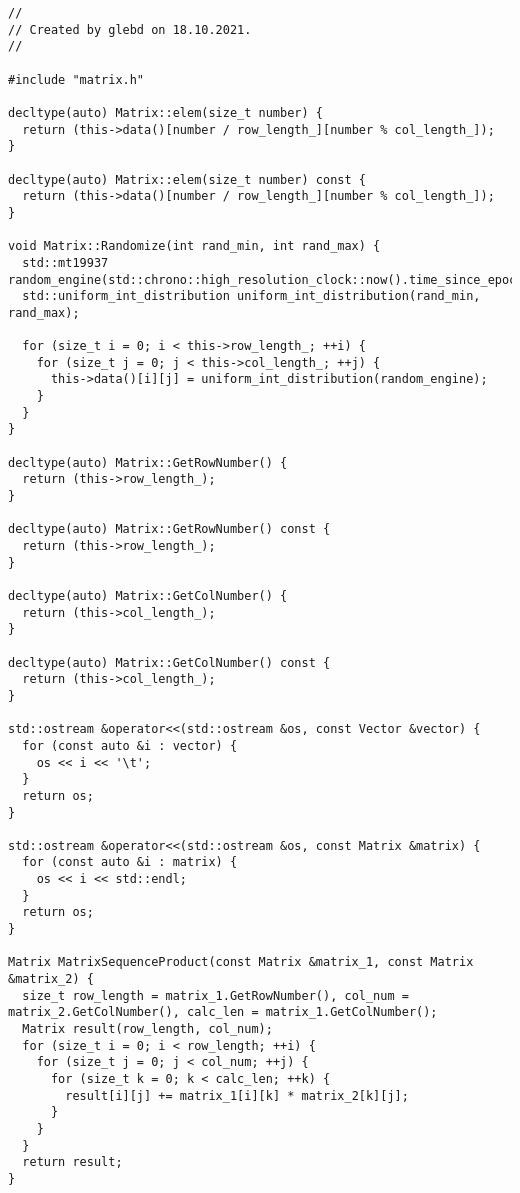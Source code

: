 \documentclass{report}
\begin{document}
\begin{lstlisting}
//
// Created by glebd on 18.10.2021.
//

#include "matrix.h"

decltype(auto) Matrix::elem(size_t number) {
  return (this->data()[number / row_length_][number % col_length_]);
}

decltype(auto) Matrix::elem(size_t number) const {
  return (this->data()[number / row_length_][number % col_length_]);
}

void Matrix::Randomize(int rand_min, int rand_max) {
  std::mt19937 random_engine(std::chrono::high_resolution_clock::now().time_since_epoch().count());
  std::uniform_int_distribution uniform_int_distribution(rand_min, rand_max);

  for (size_t i = 0; i < this->row_length_; ++i) {
    for (size_t j = 0; j < this->col_length_; ++j) {
      this->data()[i][j] = uniform_int_distribution(random_engine);
    }
  }
}

decltype(auto) Matrix::GetRowNumber() {
  return (this->row_length_);
}

decltype(auto) Matrix::GetRowNumber() const {
  return (this->row_length_);
}

decltype(auto) Matrix::GetColNumber() {
  return (this->col_length_);
}

decltype(auto) Matrix::GetColNumber() const {
  return (this->col_length_);
}

std::ostream &operator<<(std::ostream &os, const Vector &vector) {
  for (const auto &i : vector) {
    os << i << '\t';
  }
  return os;
}

std::ostream &operator<<(std::ostream &os, const Matrix &matrix) {
  for (const auto &i : matrix) {
    os << i << std::endl;
  }
  return os;
}

Matrix MatrixSequenceProduct(const Matrix &matrix_1, const Matrix &matrix_2) {
  size_t row_length = matrix_1.GetRowNumber(), col_num = matrix_2.GetColNumber(), calc_len = matrix_1.GetColNumber();
  Matrix result(row_length, col_num);
  for (size_t i = 0; i < row_length; ++i) {
    for (size_t j = 0; j < col_num; ++j) {
      for (size_t k = 0; k < calc_len; ++k) {
        result[i][j] += matrix_1[i][k] * matrix_2[k][j];
      }
    }
  }
  return result;
}


\end{lstlisting}
\end{document}
